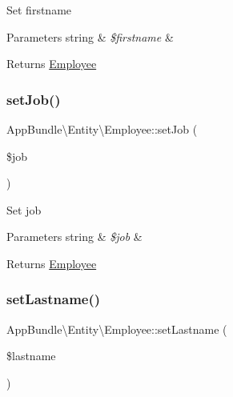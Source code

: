 Set firstname


\begin{DoxyParams}[1]{Parameters}
string & {\em \$firstname} & \\
\hline
\end{DoxyParams}
\begin{DoxyReturn}{Returns}
\mbox{\hyperlink{class_app_bundle_1_1_entity_1_1_employee}{Employee}} 
\end{DoxyReturn}
\mbox{\label{class_app_bundle_1_1_entity_1_1_employee_a65a7565c426fdea00b46bb5453f75465}} 
\subsubsection{\texorpdfstring{set\+Job()}{setJob()}}
{\footnotesize\ttfamily App\+Bundle\textbackslash{}\+Entity\textbackslash{}\+Employee\+::set\+Job (\begin{DoxyParamCaption}\item[{}]{\$job }\end{DoxyParamCaption})}

Set job


\begin{DoxyParams}[1]{Parameters}
string & {\em \$job} & \\
\hline
\end{DoxyParams}
\begin{DoxyReturn}{Returns}
\mbox{\hyperlink{class_app_bundle_1_1_entity_1_1_employee}{Employee}} 
\end{DoxyReturn}
\mbox{\label{class_app_bundle_1_1_entity_1_1_employee_a2df5450a8b6fa806ab2eb0fca83c8adb}} 
\subsubsection{\texorpdfstring{set\+Lastname()}{setLastname()}}
{\footnotesize\ttfamily App\+Bundle\textbackslash{}\+Entity\textbackslash{}\+Employee\+::set\+Lastname (\begin{DoxyParamCaption}\item[{}]{\$lastname }\end{DoxyParamCaption})}

